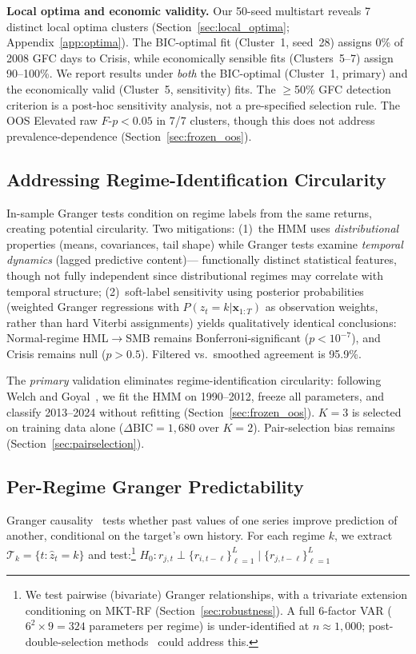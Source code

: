 \documentclass[sigconf,anonymous]{acmart}
\begin{document}
\textbf{Local optima and economic validity.}
Our 50-seed multistart reveals 7 distinct local optima clusters (Section~\ref{sec:local_optima};
Appendix~\ref{app:optima}). The BIC-optimal fit (Cluster~1, seed~28) assigns 0\% of 2008
GFC days to Crisis, while economically sensible fits (Clusters~5--7) assign
90--100\%. We report results under \emph{both} the BIC-optimal (Cluster~1, primary)
and the economically valid (Cluster~5, sensitivity) fits. The $\geq$50\% GFC detection
criterion is a post-hoc sensitivity analysis, not a pre-specified selection rule.
The OOS Elevated raw $F$-$p < 0.05$ in 7/7 clusters, though this
does not address prevalence-dependence (Section~\ref{sec:frozen_oos}).

\subsection{Addressing Regime-Identification Circularity}

In-sample Granger tests condition on regime labels from the same returns,
creating potential circularity. Two mitigations: (1)~the HMM uses
\emph{distributional} properties (means, covariances, tail shape) while
Granger tests examine \emph{temporal dynamics} (lagged predictive content)---
functionally distinct statistical features, though not fully independent
since distributional regimes may correlate with temporal structure;
(2)~soft-label sensitivity using posterior probabilities (weighted Granger
regressions with $P(z_t = k | \mathbf{x}_{1:T})$ as observation weights,
rather than hard Viterbi assignments) yields qualitatively identical
conclusions: Normal-regime HML$\to$SMB remains Bonferroni-significant
($p < 10^{-7}$), and Crisis remains null ($p > 0.5$).
Filtered vs.\ smoothed agreement is 95.9\%.

The \emph{primary} validation eliminates regime-identification circularity:
following Welch and Goyal~\cite{welch2008comprehensive}, we fit the HMM on
1990--2012, freeze all parameters, and classify 2013--2024 without refitting
(Section~\ref{sec:frozen_oos}). $K = 3$ is selected on training data alone
($\Delta\text{BIC} = 1{,}680$ over $K = 2$). Pair-selection bias remains
(Section~\ref{sec:pairselection}).

\subsection{Per-Regime Granger Predictability}
\label{sec:granger_method}

Granger causality~\cite{granger1969investigating,shojaie2022granger} tests whether past values
of one series improve prediction of another, conditional on the target's own history.
For each regime $k$, we extract $\mathcal{T}_k = \{t : \hat{z}_t = k\}$
and test:\footnote{We test pairwise (bivariate) Granger relationships, with a
trivariate extension conditioning on MKT-RF (Section~\ref{sec:robustness}).
A full 6-factor VAR ($6^2 \times 9 = 324$ parameters per regime) is
under-identified at $n \approx 1{,}000$; post-double-selection
methods~\cite{hecq2023granger} could address this.}
$H_0: r_{j,t} \perp \{r_{i,t-\ell}\}_{\ell=1}^{L} \mid \{r_{j,t-\ell}\}_{\ell=1}^{L}$
\end{document}

